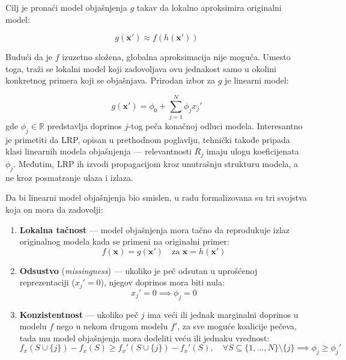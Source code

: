 Cilj je pronaći model objašnjenja $g$ takav da lokalno aproksimira originalni 
model:

\begin{equation}
    g(\mathbf{x}') \approx f(h(\mathbf{x}'))
\end{equation}

Budući da je $f$ izuzetno složena, globalna aproksimacija nije moguća. Umesto 
toga, traži se lokalni model koji zadovoljava ovu jednakost samo u okolini 
konkretnog primera koji se objašnjava. Prirodan izbor za $g$ je linearni model:

\begin{equation}
    g(\mathbf{x}') = \phi_0 + \sum_{j=1}^{N} \phi_j x_j'
\end{equation}
gde $\phi_j \in \mathbb{R}$ predstavlja doprinos $j$-tog peča konačnoj 
odluci modela. Interesantno je primetiti da LRP, opisan u prethodnom poglavlju, 
tehnički takođe pripada klasi linearnih modela objašnjenja — relevantnosti 
$R_j$ imaju ulogu koeficijenata $\phi_j$. Međutim, LRP ih izvodi propagacijom 
kroz unutrašnju strukturu modela, a ne kroz posmatranje ulaza i izlaza.

Da bi linearni model objašnjenja bio smislen, u radu \cite{lundberg2017shap} formalizovana su tri svojstva koja on mora da zadovolji:

\begin{enumerate}
    \item \textbf{Lokalna tačnost} — model objašnjenja mora tačno da reprodukuje 
    izlaz originalnog modela kada se primeni na originalni primer:
    \begin{equation}
        f(\mathbf{x}) = g(\mathbf{x}') \quad \text{za } \mathbf{x} = h(\mathbf{x}')
    \end{equation}

    \item \textbf{Odsustvo} (\textit{missingness}) — ukoliko je peč odsutan 
    u uprošćenoj reprezentaciji ($x_j' = 0$), njegov doprinos mora biti nula:
    \begin{equation}
        x_j' = 0 \implies \phi_j = 0
    \end{equation}

    \item \textbf{Konzistentnost} — ukoliko peč $j$ ima veći ili jednak 
    marginalni doprinos u modelu $f$ nego u nekom drugom modelu $f'$, za sve 
    moguće koalicije pečeva, tada mu model objašnjenja mora dodeliti veću 
    ili jednaku vrednost:
    \begin{equation}
        f_x(S \cup \{j\}) - f_x(S) \geq f_x'(S \cup \{j\}) - f_x'(S), 
        \quad \forall S \subseteq \{1,\ldots,N\} \setminus \{j\}
        \implies \phi_j \geq \phi_j'
    \end{equation}
\end{enumerate}

